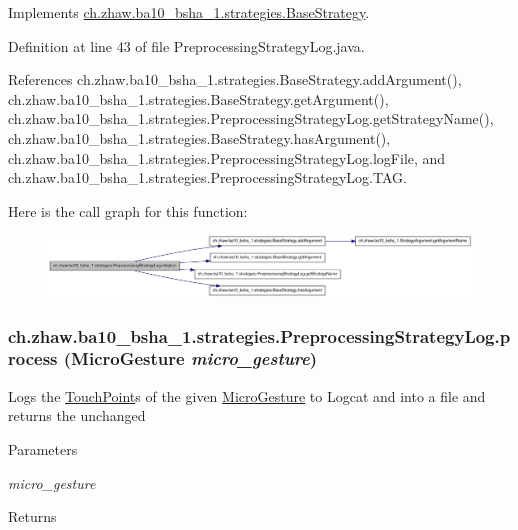 Implements \hyperlink{classch_1_1zhaw_1_1ba10__bsha__1_1_1strategies_1_1BaseStrategy_af6ea27835befac71906915236a347450}{ch.zhaw.ba10\_\-bsha\_\-1.strategies.BaseStrategy}.

Definition at line 43 of file PreprocessingStrategyLog.java.

References ch.zhaw.ba10\_\-bsha\_\-1.strategies.BaseStrategy.addArgument(), ch.zhaw.ba10\_\-bsha\_\-1.strategies.BaseStrategy.getArgument(), ch.zhaw.ba10\_\-bsha\_\-1.strategies.PreprocessingStrategyLog.getStrategyName(), ch.zhaw.ba10\_\-bsha\_\-1.strategies.BaseStrategy.hasArgument(), ch.zhaw.ba10\_\-bsha\_\-1.strategies.PreprocessingStrategyLog.logFile, and ch.zhaw.ba10\_\-bsha\_\-1.strategies.PreprocessingStrategyLog.TAG.

Here is the call graph for this function:\nopagebreak
\begin{figure}[H]
\begin{center}
\leavevmode
\includegraphics[width=420pt]{classch_1_1zhaw_1_1ba10__bsha__1_1_1strategies_1_1PreprocessingStrategyLog_acac70ca9f34f19eb4f6a762895b2ffec_cgraph}
\end{center}
\end{figure}
\hypertarget{classch_1_1zhaw_1_1ba10__bsha__1_1_1strategies_1_1PreprocessingStrategyLog_a4a22fc4b981ca9898e730579f93744fe}{
\subsubsection[{process}]{ ch.zhaw.ba10\_\-bsha\_\-1.strategies.PreprocessingStrategyLog.process ({\bf MicroGesture} {\em micro\_\-gesture})}}
\label{classch_1_1zhaw_1_1ba10__bsha__1_1_1strategies_1_1PreprocessingStrategyLog_a4a22fc4b981ca9898e730579f93744fe}
Logs the \hyperlink{classch_1_1zhaw_1_1ba10__bsha__1_1_1TouchPoint}{TouchPoint}s of the given \hyperlink{}{MicroGesture} to Logcat and into a file and returns the unchanged


\begin{DoxyParams}{Parameters}
\item[{\em micro\_\-gesture}]\end{DoxyParams}
\begin{DoxyReturn}{Returns}

\end{DoxyReturn}



